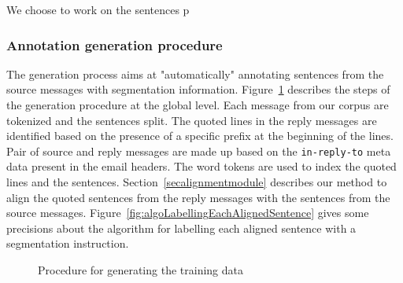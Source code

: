 We choose to work on the sentences p



\subsubsection{Annotation generation procedure}
\label{}

The generation process aims at "automatically" annotating sentences from the source messages with segmentation information.
Figure~\ref{fig:procedureTrainingDataGeneration} describes the steps of the generation procedure at the global level. 
Each message from our corpus are tokenized and the sentences split. The quoted lines in the reply messages are identified based on the presence of a specific prefix at the beginning of the lines. 
Pair of source and reply messages are made up based on the \texttt{in-reply-to} meta data present in the email headers.
The word tokens are used to index the quoted lines and the sentences. 
Section~\ref{secalignmentmodule} describes our method to align the quoted sentences from the reply messages with the sentences from the source messages. 
Figure~\ref{fig:algoLabellingEachAlignedSentence} gives some precisions about the algorithm for labelling each aligned sentence with a segmentation instruction. 

\begin{figure}[ht!]
{}

\caption{Procedure for generating the training data}
\label{fig:procedureTrainingDataGeneration}
\end{figure}


